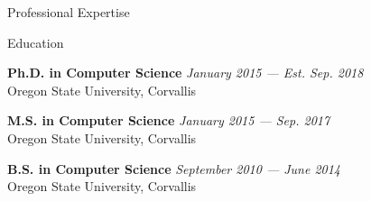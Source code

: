 \documentclass{resume} %
\begin{document}
\begin{rSection}{Professional Expertise}
	\pagebreak
	
	\begin{rSection}{Education}
		
		{\bf Ph.D. in Computer Science} \hfill {\em January 2015 --- Est. Sep. 2018} \\ 
		Oregon State University, Corvallis\smallskip 
		
		
		{\bf M.S. in Computer Science} \hfill {\em January 2015 --- Sep. 2017} \\ 
		Oregon State University, Corvallis\smallskip 
		
		
		{\bf B.S. in Computer Science} \hfill {\em September 2010 --- June 2014} \\ 
		Oregon State University, Corvallis\smallskip 
		
	\end{rSection}
	
\end{rSection}

\end{document}
